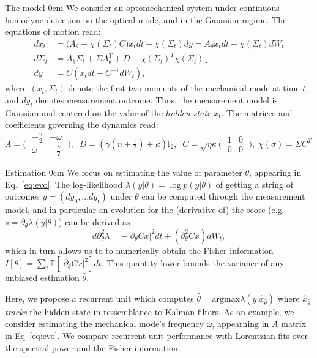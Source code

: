 \documentclass[xcolor={table}]{beamer}
\begin{document}
\begin{frame}[fragile=singleslide,t]
\begin{columns}[onlytextwidth,T]
\begin{column}{.47\textwidth}
\begin{block}{The model}
   0cm \dimexpr\linewidth-0cm\relax
We consider an optomechanical system under continuous homodyne detection on the optical mode, and in the Gaussian regime. The equations of motion read:
\begin{align}\label{eq:evo}
dx_t &= \big(A_\theta - \chi(\Sigma_t) C\big) x_t dt + \chi(\Sigma_t) dy = A_\theta x_t dt + \chi(\Sigma_t) dW_t \\
d\Sigma_t &= A_\theta \Sigma_t + \Sigma A_\theta^T + D - \chi(\Sigma_t)^T \chi(\Sigma_t) \nonumber¸\\
dy &= C(x_tdt + C^{-1}dW_t), \nonumber
\end{align}
where $(x_t,\Sigma_t)$ denote the first two moments of the mechanical mode at time $t$, and $dy_t$ denotes measurement outcome. Thus, the measurement model is Gaussian and centered on the value of the \textit{hidden state} $x_t$. The matrices and coefficients governing the dynamics read: {\normalsize$A = \Big(\;\begin{matrix}-\frac{\gamma}{2}& -\omega\\\omega & -\frac{\gamma}{2}\end{matrix}\;\Big), \; \; D = (\gamma (n + \frac{1}{2}) + \kappa )\mathbb{I}_2, \; \; C = \sqrt{\eta \kappa} \Big( \; \begin{matrix} 1 & 0 \\ 0 & 0 \end{matrix}\;\Big), \; \chi(\sigma) = \Sigma C^T $}
\end{block}
\begin{block}{Estimation}
   0cm \dimexpr\linewidth-0cm\relax
  We focus on estimating the value of parameter $\theta$, appearing in Eq.~\eqref{eq:evo}. The log-likelihood $\lambda(y|\theta) = \log p(y|\theta)$ of getting a string of outcomes $y= (dy_0, ... dy_t)$ under $\theta$ can be computed through the measurement model, and in particular an evolution for the (derivative of) the score (e.g. $s = \partial_\theta \lambda(y|\theta)$) can be derived as
\begin{equation*}
d \partial^2_\theta \lambda = - |\partial_\theta C x| ^2 dt + (\partial_\theta^2 C x) dW_t,
\end{equation*}which in turn allows us to to numerically obtain the Fisher information $I[\theta] = \sum_t \mathbb{E}[|\partial_\theta C x|^2] dt$. This quantity lower bounds the variance of any unbiased estimation $\hat{\theta}$.

Here, we propose a recurrent unit which computes $\hat{\theta} = \text{argmax}\lambda(y|\hat{x}_{\hat{\theta}})$ where $\hat{x}_{\hat{\theta}}$ \textit{tracks} the hidden state in ressemblance to Kalman filters. As an example, we consider estimating the mechanical mode's frequency $\omega$, appearning in $A$ matrix in Eq~\eqref{eq:evo}. We compare recurrent unit performance with  Lorentzian fits over the spectral power and the Fisher information.


\end{block}
\end{column}
\end{columns}
\end{frame}
\end{document}
